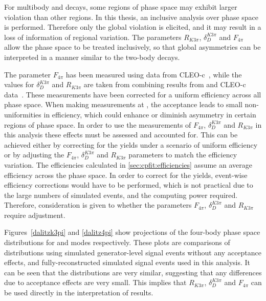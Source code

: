For multibody \decay{\Dz}{\Kmp\pipm\pimp\pipm} and \decay{\Dz}{\pip\pim\pip\pim} decays, some regions of phase space may exhibit larger \CP violation than other regions. In this thesis, an inclusive analysis over phase space is performed. Therefore only the global \CP violation is elicited, and it may result in a loss of information of regional variation. The parameters $R_{K3\pi}$, $\delta_D^{K3\pi}$ and $F_{4\pi}$ allow the phase space to be treated inclusively, so that global asymmetries can be interpreted in a manner similar to the two-body \Dz decays.

The parameter $F_{4\pi}$ has been measured using data from CLEO-c~\cite{charm4pi}, while the values for $\delta_D^{K3\pi}$ and $R_{K3\pi}$ are taken from combining results from \lhcb and CLEO-c data~\cite{charmk3pi,charmk3pi_errata,LHCb-PAPER-2015-057}. These measurements have been corrected for a uniform efficiency across all phase space. When making measurements at \lhcb, the \lhcb acceptance leads to small non-uniformities in efficiency, which could enhance or diminish asymmetry in certain regions of phase space. In order to use the measurements of $F_{4\pi}$, $\delta_D^{K3\pi}$ and $R_{K3\pi}$ in this analysis these effects must be assessed and accounted for. This can be achieved either by correcting for the \lhcb yields under a scenario of uniform efficiency or by adjusting the $F_{4\pi}$, $\delta_D^{K3\pi}$ and $R_{K3\pi}$ parameters to match the \lhcb efficiency variation. The efficiencies calculated in \sect\ref{sec:cpfit:efficiencies} assume an average efficiency across the phase space. In order to correct for the \lhcb yields, event-wise efficiency corrections would have to be performed, which is not practical due to the large numbers of simulated events, and the computing power required. Therefore, consideration is given to whether the parameters $F_{4\pi}$, $\delta_D^{K3\pi}$ and $R_{K3\pi}$ require adjustment.

Figures~\ref{dalitzk3pi} and \ref{dalitz4pi} show projections of the four-body phase space distributions for \kpipipi and \pipipipi modes respectively. These plots are comparisons of distributions using simulated generator-level signal events without any acceptance effects, and fully-reconstructed simulated signal events used in this analysis. It can be seen that the distributions are very similar, suggesting that any differences due to \lhcb acceptance effects are very small. This implies that $R_{K3\pi}$, $\delta_D^{K3\pi}$ and $F_{4\pi}$ can be used directly in the interpretation of \lhcb results.

